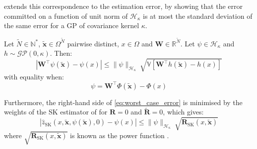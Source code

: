 extends this correspondence to the estimation error, by showing that the error committed on a function of unit norm of $\mathcal{H}_\kappa$ is at most the standard deviation of the same error for a GP of covariance kernel $\kappa$.

\begin{proposition}\label{th:power_function}
	Let $\tilde{N}\in\mathbb{N}^*$, $\tilde{\mathbf{x}}\in\Omega^{\tilde{N}}$ pairwise distinct, $x\in\Omega$ and $\mathbf{W}\in\mathbb{R}^{\tilde{N}}$. Let $\psi\in\mathcal{H}_\kappa$ and $h\sim\mathcal{GP}(0,\kappa)$. Then:
	\begin{equation}
		\left|\mathbf{W}^\top\psi(\tilde{\mathbf{x}})-\psi(x)\right|\leq\|\psi\|_{\mathcal{H}_\kappa}\:\sqrt{\mathbb{V}\left[\mathbf{W}^\top h(\tilde{\mathbf{x}})-h(x)\right]}\label{eq:worst_case_error}
	\end{equation}
	with equality when:
	\begin{equation}
		\psi=\mathbf{W}^\top\Phi(\tilde{\mathbf{x}})-\Phi(x)
	\end{equation}

	Furthermore, the right-hand side of \eqref{eq:worst_case_error} is minimised by the weights of the SK estimator of  for $\mathbf{R}=0$ and $\tilde{\mathbf{R}}=0$, which gives:
	\begin{equation}
		\left|\hat{z}_{\mathrm{SK}}(x,\tilde{\mathbf{x}},\psi(\tilde{\mathbf{x}}),0)-\psi(x)\right|\leq\|\psi\|_{\mathcal{H}_\kappa}\:\sqrt{\mathbf{R}_{\mathrm{SK}}(x,\tilde{\mathbf{x}})}
	\end{equation}
	where $\sqrt{\mathbf{R}_{\mathrm{SK}}(x,\tilde{\mathbf{x}})}$ is known as the power function \cite{bib:Wendland-error}.
\end{proposition}

